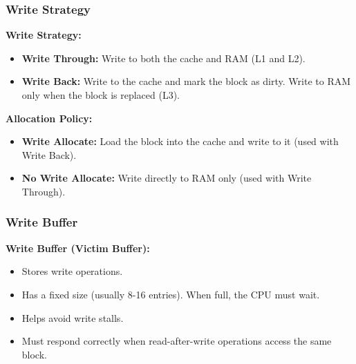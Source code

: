 
\begin{frame}
    \frametitle{Write Strategy}
    \textbf{Write Strategy:}
    \begin{itemize}
        \item \textbf{Write Through:} Write to both the cache and RAM (L1 and L2).
        \item \textbf{Write Back:} Write to the cache and mark the block as dirty. Write to RAM only when the block is replaced (L3).
    \end{itemize}
    
    \textbf{Allocation Policy:}
    \begin{itemize}
        \item \textbf{Write Allocate:} Load the block into the cache and write to it (used with Write Back).
        \item \textbf{No Write Allocate:} Write directly to RAM only (used with Write Through).
    \end{itemize}
\end{frame}

\begin{frame}
    \frametitle{Write Buffer}
    \textbf{Write Buffer (Victim Buffer):}
    \begin{itemize}
        \item Stores write operations.
        \item Has a fixed size (usually 8-16 entries). When full, the CPU must wait.
        \item Helps avoid write stalls.
        \item Must respond correctly when read-after-write operations access the same block.
    \end{itemize}
\end{frame}



